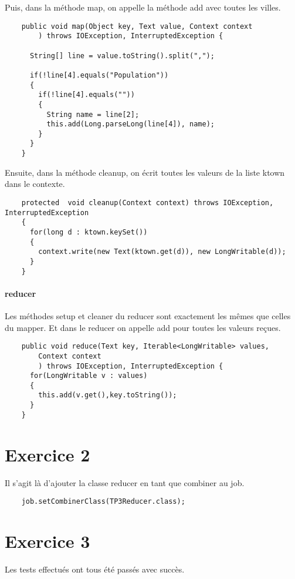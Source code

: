 \documentclass[a4paper]{article}
\begin{document}
Puis,	dans la	méthode	 map,	 on	appelle	la	méthode	 add	 avec	toutes	les	villes.
\begin{lstlisting}
    public void map(Object key, Text value, Context context
        ) throws IOException, InterruptedException {

      String[] line = value.toString().split(",");

      if(!line[4].equals("Population"))
      {
        if(!line[4].equals(""))
        {
          String name = line[2];
          this.add(Long.parseLong(line[4]), name);
        }
      }
    }
\end{lstlisting}
Ensuite, dans	 la	 méthode	 cleanup,	 on	 écrit	 toutes	 les	 valeurs	 de	 la	 liste	 ktown	dans	 le
contexte.

\begin{lstlisting}
    protected  void cleanup(Context context) throws IOException, InterruptedException
    {
      for(long d : ktown.keySet())
      {
        context.write(new Text(ktown.get(d)), new LongWritable(d));
      }
    }
\end{lstlisting}

\paragraph{reducer}
Les	 méthodes	 setup	 et	 cleaner	 	 du	 reducer	 sont	 exactement	 les	 mêmes	 que	 celles	 du
mapper.	Et	dans	le	 reducer	 on	appelle	 add	 pour	toutes	les	valeurs	reçues.

\begin{lstlisting}
    public void reduce(Text key, Iterable<LongWritable> values,
        Context context
        ) throws IOException, InterruptedException {
      for(LongWritable v : values)
      {
        this.add(v.get(),key.toString());
      }
    }
\end{lstlisting}

\section{Exercice 2}
Il s’agit là d’ajouter la classe reducer en tant que combiner au job.
\begin{lstlisting}
    job.setCombinerClass(TP3Reducer.class);
\end{lstlisting}



\section{Exercice 3}
Les tests effectués ont tous été passés avec succès.
\end{document}
